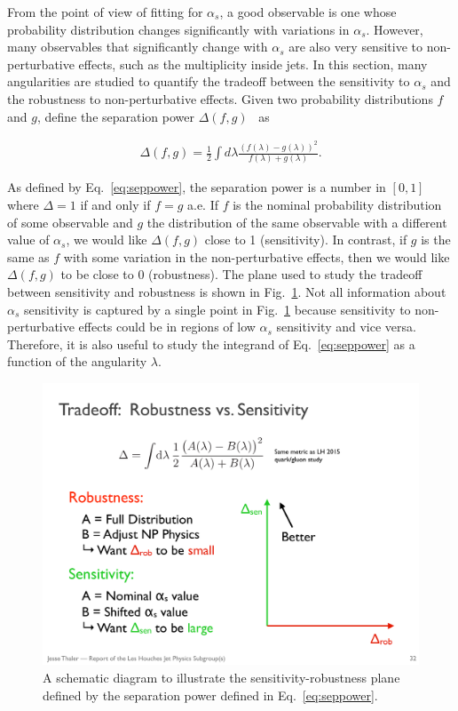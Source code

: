 From the point of view of fitting for $\alpha_s$, a good observable is one whose probability distribution changes significantly with variations in $\alpha_s$.  However, many observables that significantly change with $\alpha_s$ are also very sensitive to non-perturbative effects, such as the multiplicity inside jets.  In this section, many angularities are studied to quantify the tradeoff between the sensitivity to $\alpha_s$ and the robustness to non-perturbative effects.  Given two probability distributions $f$ and $g$, define the separation power $\Delta(f,g)$~\cite{Harrison:1998yr} as

\begin{align}
\label{eq:seppower}
\Delta(f,g)=\frac{1}{2}\int d\lambda \frac{(f(\lambda)-g(\lambda))^2}{f(\lambda)+g(\lambda)}.
\end{align}

\noindent As defined by Eq.~\ref{eq:seppower}, the separation power is a number in $[0,1]$ where $\Delta=1$ if and only if $f=g$ a.e.  If $f$ is the nominal probability distribution of some observable and $g$ the distribution of the same observable with a different value of $\alpha_s$, we would like $\Delta(f,g)$ close to 1 (sensitivity).  In contrast, if $g$ is the same as $f$ with some variation in the non-perturbative effects, then we would like $\Delta(f,g)$ to be close to $0$ (robustness).  The plane used to study the tradeoff between sensitivity and robustness is shown in Fig.~\ref{fig:robustnessschematic}.  Not all information about $\alpha_s$ sensitivity is captured by a single point in Fig.~\ref{fig:robustnessschematic} because sensitivity to non-perturbative effects could be in regions of low $\alpha_s$ sensitivity and vice versa.  Therefore, it is also useful to study the integrand of Eq.~\ref{eq:seppower} as a function of the angularity $\lambda$.

\begin{figure}[h!]
\begin{center}
\includegraphics[width = 0.4\columnwidth]{figures/robustnessschematic.pdf}
\end{center}
\caption{A schematic diagram to illustrate the sensitivity-robustness plane defined by the separation power defined in Eq.~\ref{eq:seppower}.}
\label{fig:robustnessschematic}
\end{figure}

